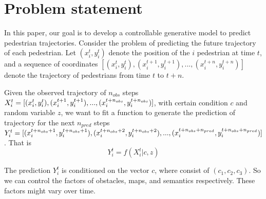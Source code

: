 \documentclass[sigconf]{acmart}
\begin{document}
\section{Problem statement}

In this paper, our goal is to develop a controllable generative model to predict pedestrian trajectories.
Consider the problem of predicting the future trajectory of each pedestrian. Let $(x_i^t, y_i^t)$ denote the position of the $i$ pedestrian at time $t$, and a sequence of coordinates  $[(x_i^{t}, y_i^{t}), (x_i^{t+1}, y_i^{t+1}), ..., (x_i^{t+n}, y_i^{t+n})]$ denote the trajectory of pedestrians from time $t$ to $t+n$.

Given the observed trajectory of $n_{obs}$ steps $X_i^t = [(x_i^{t}, y_i^{t}), \\ (x_i^{t+1}, y_i^{t+1}), ..., (x_i^{t+n_{obs}}, y_i^{t+n_{obs}})]$, with certain condition $c$ and random variable $z$,  we want to fit a function to generate the prediction of trajectory for the next $n_{pred}$ steps $Y_i^t = [(x_i^{t+n_{obs}+1}, y_i^{t+n_{obs}+1}), \\ (x_i^{t+n_{obs}+ 2}, y_i^{t+n_{obs}+2}), ...,  (x_i^{t+n_{obs}+ n_{pred}}, y_i^{t+n_{obs}+n_{pred}})]$. That is
$$ Y_i^t = f(X_i^t \vert c, z) $$

The prediction $Y_i^t$ is conditioned on the vector $c$, where consist of $(c_1, c_2, c_3)$. So we can control the factors of obstacles, maps, and semantics respectively. These factors might vary over time.




\end{document}
